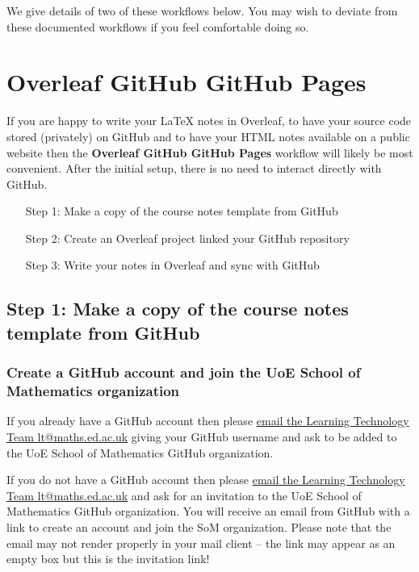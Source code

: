We give details of two of these workflows below. You may wish to deviate from these documented workflows if you feel comfortable doing so. 


\section{Overleaf \textrightarrow{} GitHub \textrightarrow{} GitHub Pages}

If you are happy to write your \LaTeX{} notes in Overleaf, to have your source code stored (privately) on GitHub and to have your HTML notes available on a public website then the \textbf{Overleaf \textrightarrow{} GitHub \textrightarrow{} GitHub Pages} workflow will likely be most convenient. After the initial setup, there is no need to interact directly with GitHub.

\begin{enumerate}[align=left]
    \item[Step 1:] Make a copy of the course notes template from GitHub
    \item[Step 2:] Create an Overleaf project linked your GitHub repository
    \item[Step 3:] Write your notes in Overleaf and sync with GitHub
\end{enumerate}


\subsection{Step 1: Make a copy of the course notes template from GitHub}

\subsubsection{Create a GitHub account and join the UoE School of Mathematics organization}

If you already have a GitHub account then please  \href{mailto:lt@maths.ed.ac.uk?subject=Please%20add%20me%20to%20SoM%20GitHub%20organization}{email the Learning Technology Team lt@maths.ed.ac.uk} giving your GitHub username and ask to be added to the UoE School of Mathematics GitHub organization. 

If you do not have a GitHub account then please \href{mailto:lt@maths.ed.ac.uk?subject=Please%20add%20me%20to%20SoM%20GitHub%20organization}{email the Learning Technology Team lt@maths.ed.ac.uk} and ask for an invitation to the UoE School of Mathematics GitHub organization. You will receive an email from GitHub with a link to create an account and join the SoM organization. Please note that the email may not render properly in your mail client -- the link may appear as an empty box but this is the invitation link!

